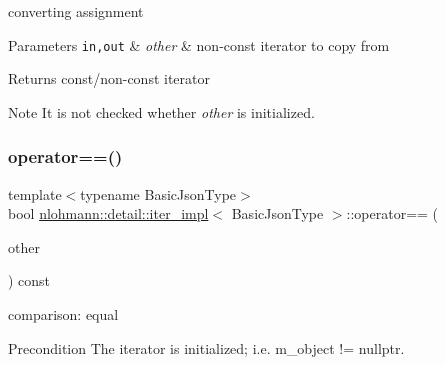 converting assignment 


\begin{DoxyParams}[1]{Parameters}
\mbox{\tt in,out}  & {\em other} & non-\/const iterator to copy from \\
\hline
\end{DoxyParams}
\begin{DoxyReturn}{Returns}
const/non-\/const iterator 
\end{DoxyReturn}
\begin{DoxyNote}{Note}
It is not checked whether {\itshape other} is initialized. 
\end{DoxyNote}
\mbox{\label{classnlohmann_1_1detail_1_1iter__impl_a2b592605b63ae7f5401996ffa3b14393}} 
\subsubsection{\texorpdfstring{operator==()}{operator==()}}
{\footnotesize\ttfamily template$<$typename Basic\+Json\+Type$>$ \\
bool \hyperlink{classnlohmann_1_1detail_1_1iter__impl}{nlohmann\+::detail\+::iter\+\_\+impl}$<$ Basic\+Json\+Type $>$\+::operator== (\begin{DoxyParamCaption}\item[{const \hyperlink{classnlohmann_1_1detail_1_1iter__impl}{iter\+\_\+impl}$<$ Basic\+Json\+Type $>$ \&}]{other }\end{DoxyParamCaption}) const\hspace{0.3cm}{\ttfamily [inline]}}



comparison\+: equal 

\begin{DoxyPrecond}{Precondition}
The iterator is initialized; i.\+e. {\ttfamily m\+\_\+object != nullptr}. 
\end{DoxyPrecond}
\mbox{\label{classnlohmann_1_1detail_1_1iter__impl_aaf3620b8dfa4bed8a9ac2b51dd55dbd7}} 
